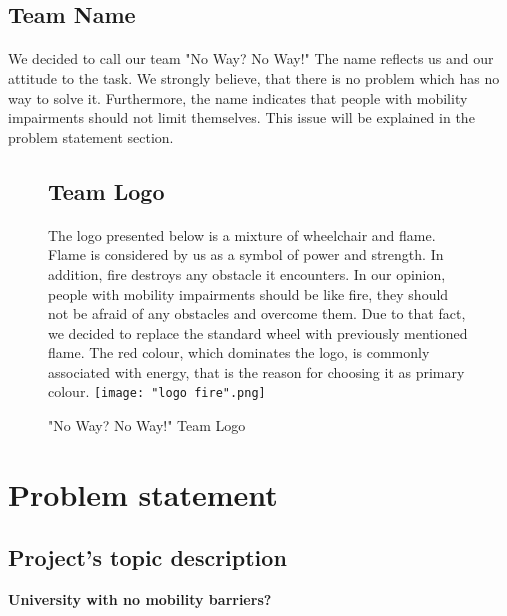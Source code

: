 \documentclass[12pt]{article}
\begin{document}
\subsection{Team Name}
\paragraph{} We decided to call our team "No Way? No Way!" The name reflects us and our attitude to the task. We strongly believe, that there is no problem which has no way to solve it. Furthermore, the name indicates that people with mobility impairments should not limit themselves. This issue will be explained in the problem statement section.

\newpage

\begin{figure}[H]
\subsection{Team Logo}
\paragraph{}The logo presented below is a mixture of wheelchair and flame. Flame is considered by us as a symbol of power and strength. In addition, fire destroys any obstacle it encounters. In our opinion, people with mobility impairments should be like fire, they should not be afraid of any obstacles and overcome them. Due to that fact, we decided to replace the standard wheel with previously mentioned flame. The red colour, which dominates the logo, is commonly associated with energy, that is the reason for choosing it as primary colour.
\texttt{[image: "logo fire".png]}
\caption{"No Way? No Way!" Team Logo}
\label{fig:logo}
\end{figure}

\section{Problem statement}

\subsection{Project's topic description}
\textbf{University with no mobility barriers?} \\\\
\end{document}
